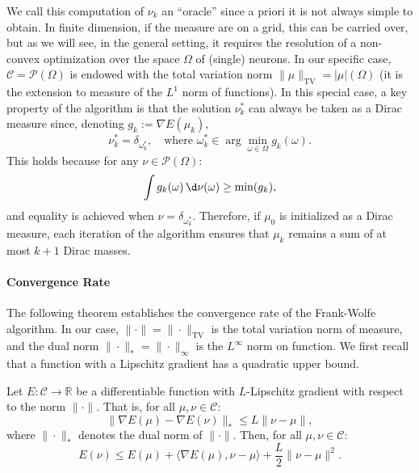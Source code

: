 We call this computation of $\nu_k$ an ``oracle'' since a priori it is not always simple to obtain. In finite dimension, if the measure are on a grid, this can be carried over, but as we will see, in the general setting, it requires the resolution of a non-convex optimization over the space $\Omega$ of (single) neurons.
%
In our specific case, $\mathcal{C} = \mathcal{P}(\Omega)$ is endowed with the total variation norm $\|\mu\|_{\mathrm{TV}} = |\mu|(\Omega)$ (it is the extension to measure of the $L^1$ norm of functions). 
%
In this special case, a key property of the algorithm is that the solution \(\nu_k^*\) can always be taken as a Dirac measure since, denoting $g_k := \nabla E(\mu_k)$, 
\[
\nu_k^* = \delta_{\omega_k^*}, \quad \text{where } \omega_k^* \in \arg\min_{\omega \in \Omega} g_k(\omega).
\]
This holds because for any \(\nu \in \mathcal{P}(\Omega)\):
\[
\int g_k(\omega) \, \d\nu(\omega) \geq \min(g_k),
\]
and equality is achieved when \(\nu = \delta_{\omega_k^*}\). Therefore, if \(\mu_0\) is initialized as a Dirac measure, each iteration of the algorithm ensures that \(\mu_k\) remains a sum of at most \(k+1\) Dirac masses.

\paragraph{Convergence Rate}

The following theorem establishes the convergence rate of the Frank-Wolfe algorithm.
%
In our case, $\|\cdot\|=\|\cdot\|_{\mathrm{TV}}$ is the total variation norm of measure, and the dual norm $\|\cdot\|_*=\|\cdot\|_{\infty}$ is the $L^\infty$ norm on function.
%
We first recall that a function with a Lipschitz gradient has a quadratic upper bound. 

\begin{lem}\label{lem:quad-upper}
Let $E: \mathcal{C} \to \mathbb{R}$ be a differentiable function with $L$-Lipschitz gradient with respect to the norm $\|\cdot\|$. That is, for all $\mu, \nu \in \mathcal{C}$:
\[
\|\nabla E(\mu) - \nabla E(\nu)\|_* \leq L \|\nu - \mu\|,
\]
where $\|\cdot\|_*$ denotes the dual norm of $\|\cdot\|$. Then, for all $\mu, \nu \in \mathcal{C}$:
\[
E(\nu) \leq E(\mu) + \langle \nabla E(\mu), \nu - \mu \rangle + \frac{L}{2} \|\nu - \mu\|^2.
\]
\end{lem}

